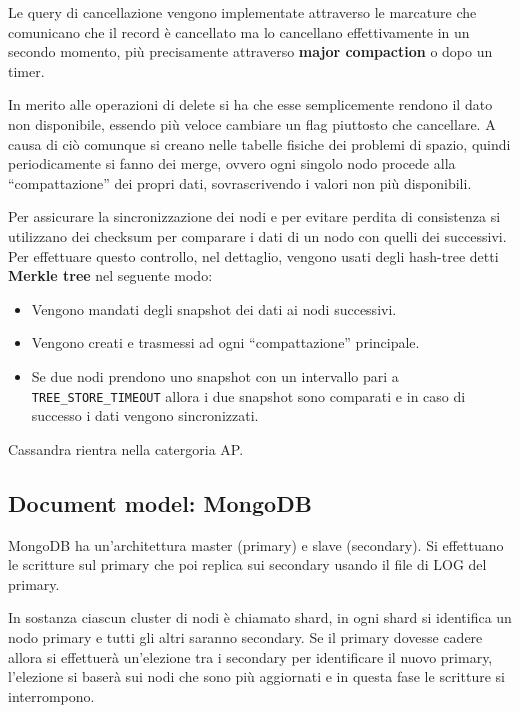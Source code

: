       Le query di cancellazione vengono implementate attraverso le marcature che
      comunicano che il record è cancellato ma lo cancellano effettivamente in un secondo
      momento, più precisamente attraverso \textbf{major compaction} o dopo un timer.

      In merito alle operazioni di delete si ha che esse semplicemente rendono il
      dato non disponibile, essendo più veloce cambiare un flag piuttosto che cancellare.
      A causa di ciò comunque si creano nelle tabelle fisiche dei problemi di
      spazio, quindi periodicamente si fanno dei merge, ovvero ogni singolo nodo
      procede alla “compattazione” dei propri dati, sovrascrivendo i valori non più
      disponibili.

      Per assicurare la sincronizzazione dei nodi e per evitare perdita di consistenza
      si utilizzano dei checksum per comparare i dati di un nodo con quelli dei
      successivi. Per effettuare questo controllo, nel dettaglio, vengono usati degli
      hash-tree detti \textbf{Merkle tree} nel seguente modo:
      \begin{itemize}
            \item Vengono mandati degli snapshot dei dati ai nodi successivi.
            \item Vengono creati e trasmessi ad ogni “compattazione” principale.
            \item Se due nodi prendono uno snapshot con un intervallo pari a
                  \texttt{TREE\_STORE\_TIMEOUT} allora i due snapshot sono comparati e in
                  caso di successo i dati vengono sincronizzati.
      \end{itemize}
      Cassandra rientra nella catergoria AP.
      \subsection{Document model: MongoDB}
      MongoDB ha un'architettura master (primary) e slave (secondary). Si effettuano le
      scritture sul primary che poi replica sui secondary usando il file di LOG del primary.

      In sostanza ciascun cluster di nodi è chiamato shard, in ogni shard si identifica
      un nodo primary e tutti gli altri saranno secondary. Se il primary dovesse cadere
      allora si effettuerà un'elezione tra i secondary per identificare il nuovo primary,
      l'elezione si baserà sui nodi che sono più aggiornati e in questa fase le
      scritture si interrompono.


